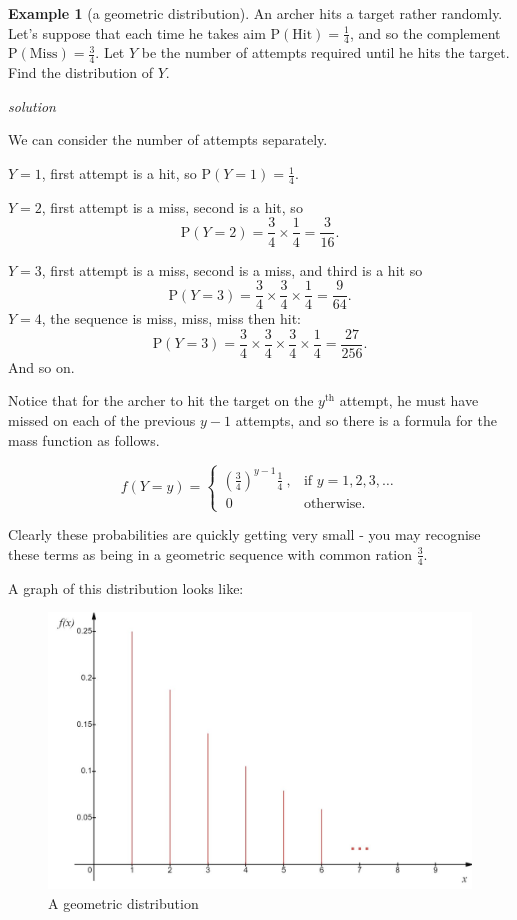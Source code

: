 \documentclass[
]{book}
\theoremstyle{definition}
\theoremstyle{definition}
\newtheorem{example}{Example}[chapter]
\theoremstyle{definition}
\theoremstyle{definition}
\theoremstyle{remark}
\begin{document}
\begin{example}[a geometric distribution]
\protect\hypertarget{exm:archer}{}\label{exm:archer}An archer hits a target rather randomly. Let's suppose that each time he takes aim \(\text{P}(\text{Hit})=\frac{1}{4}\), and so the complement \(\text{P}(\text{Miss})=\frac{3}{4}\). Let \(Y\) be the number of attempts required until he hits the target. Find the distribution of \(Y\).
\end{example}

\emph{solution}

We can consider the number of attempts separately.

\(Y=1\), first attempt is a hit, so \(\text{P}(Y=1)=\frac{1}{4}.\)

\(Y=2\), first attempt is a miss, second is a hit, so
\[\text{P}(Y=2)=\frac{3}{4}\times \frac{1}{4} = \frac{3}{16}.\]

\(Y=3\), first attempt is a miss, second is a miss, and third is a hit so
\[\text{P}(Y=3)=\frac{3}{4}\times \frac{3}{4}\times \frac{1}{4} = \frac{9}{64}.\]
\(Y=4\), the sequence is miss, miss, miss then hit:
\[\text{P}(Y=3)=\frac{3}{4}\times \frac{3}{4}\times \frac{3}{4}\times \frac{1}{4} = \frac{27}{256}.\]
And so on.

Notice that for the archer to hit the target on the \(y^{\text{th}}\) attempt, he must have missed on each of the previous \(y-1\) attempts, and so there is a formula for the mass function as follows.

\begin{equation*}
  f(Y=y)=\begin{cases}
    \left( \frac{3}{4} \right)^{y-1}\frac{1}{4} \ , & \text{if } y = 1, 2, 3, \dots \\
    \ 0 \ & \text{otherwise}.
  \end{cases}
\end{equation*}

Clearly these probabilities are quickly getting very small - you may recognise these terms as being in a geometric sequence with common ration \(\frac{3}{4}\).

A graph of this distribution looks like:

\begin{figure}

{\centering \includegraphics[width=0.75\linewidth]{./figures/geo_pdf} 

}

\caption{A geometric distribution}\label{fig:geomdriving}
\end{figure}
\end{document}

